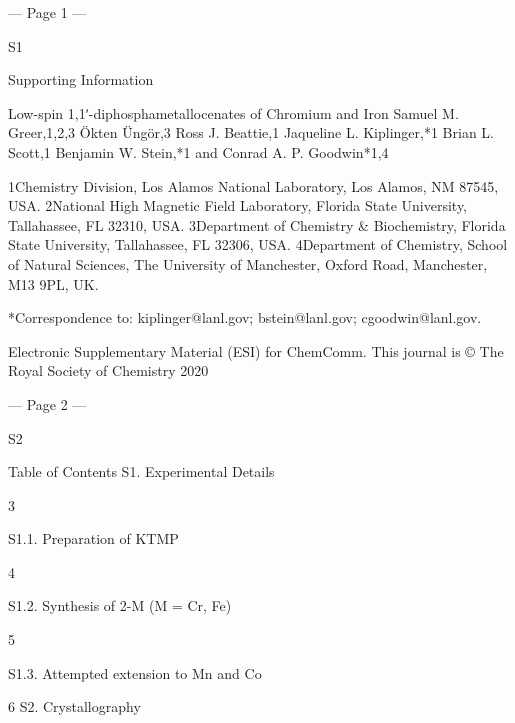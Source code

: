 --- Page 1 ---
 
 
S1 
 
 
Supporting Information 
 
Low-spin 1,1ʹ-diphosphametallocenates of Chromium and Iron 
Samuel M. Greer,1,2,3 Ökten Üngör,3 Ross J. Beattie,1 Jaqueline L. Kiplinger,*1 Brian L. Scott,1 Benjamin W. Stein,*1 and 
Conrad A. P. Goodwin*1,4 
 
1Chemistry Division, Los Alamos National Laboratory, Los Alamos, NM 87545, USA. 
2National High Magnetic Field Laboratory, Florida State University, Tallahassee, FL 32310, USA. 
3Department of Chemistry & Biochemistry, Florida State University, Tallahassee, FL 32306, USA. 
4Department of Chemistry, School of Natural Sciences, The University of Manchester, Oxford Road, Manchester, M13 9PL, 
UK. 
 
*Correspondence to: kiplinger@lanl.gov; bstein@lanl.gov; cgoodwin@lanl.gov.  
 
 
Electronic Supplementary Material (ESI) for ChemComm.
This journal is © The Royal Society of Chemistry 2020


--- Page 2 ---
 
 
S2 
 
 
Table of Contents 
S1. Experimental Details 
 
 
 
 
 
 
 
 
 
 
 
 
3 
 
S1.1.  
Preparation of KTMP 
 
 
 
 
 
 
 
 
 
 
4 
 
S1.2.  
Synthesis of 2-M (M = Cr, Fe)  
 
 
 
 
 
 
 
 
5 
 
S1.3.  
Attempted extension to Mn and Co  
 
 
 
 
 
 
 
6 
S2. Crystallography 
 
 
 
 
 
 
 
 
 
